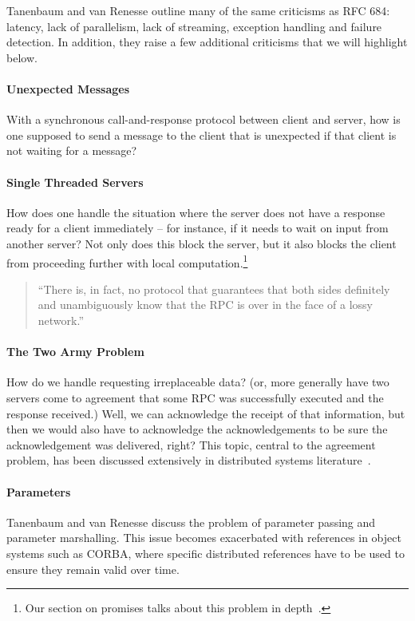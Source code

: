 Tanenbaum and van Renesse outline many of the same criticisms as RFC 684: latency, lack of parallelism, lack of streaming, exception handling and failure detection.  In addition, they raise a few additional criticisms that we will highlight below.

\paragraph{Unexpected Messages} With a synchronous call-and-response protocol between client and server, how is one supposed to send a message to the client that is unexpected if that client is not waiting for a message?
\paragraph{Single Threaded Servers} How does one handle the situation where the server does not have a response ready for a client immediately -- for instance, if it needs to wait on input from another server?  Not only does this block the server, but it also blocks the client from proceeding further with local computation.\footnote{Our section on promises talks about this problem in depth~\cite{liskov1988distributed}.}

\begin{quote}
``There is, in fact, no protocol that guarantees that both sides definitely and unambiguously know that the RPC is over in the face of a lossy network.''~\cite{tanenbaum1987critique}
\end{quote}

\paragraph{The Two Army Problem} How do we handle requesting irreplaceable data?  (or, more generally have two servers come to agreement that some RPC was successfully executed and the response received.) Well, we can acknowledge the receipt of that information, but then we would also have to acknowledge the acknowledgements to be sure the acknowledgement was delivered, right?  This topic, central to the agreement problem, has been discussed extensively in distributed systems literature~\cite{halpern1990knowledge}.

\paragraph{Parameters} Tanenbaum and van Renesse discuss the problem of parameter passing and parameter marshalling.  This issue becomes exacerbated with references in object systems such as CORBA, where specific distributed references have to be used to ensure they remain valid over time.

